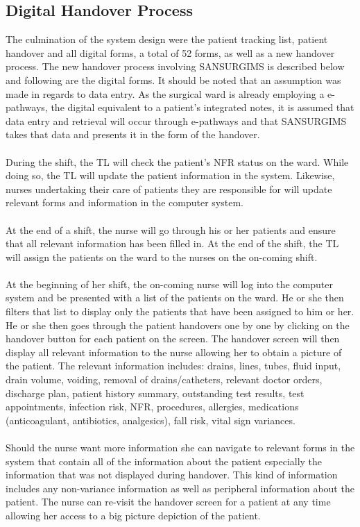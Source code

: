 \subsection{Digital Handover Process}
\label{Digital Handover Process}
The culmination of the system design were the patient tracking list, patient handover and all digital forms, a total of 52 forms, as well as a new handover process. The new handover process involving SANSURGIMS is described below and following are the digital forms. It should be noted that an assumption was made in regards to data entry. As the surgical ward is already employing a e-pathways, the digital equivalent to a patient's integrated notes, it is assumed that data entry and retrieval will occur through e-pathways and that SANSURGIMS takes that data and presents it in the form of the handover.
\\ \\
During the shift, the TL will check the patient's NFR status on the ward. While doing so, the TL will update the patient information in the system. Likewise, nurses undertaking their care of patients they are responsible for will update relevant forms and information in the computer system. 
\\ \\
At the end of a shift, the nurse will go through his or her patients and ensure that all relevant information has been filled in. At the end of the shift, the TL will assign the patients on the ward to the nurses on the on-coming shift.
\\ \\
At the beginning of her shift, the on-coming nurse will log into the computer system and be presented with a list of the patients on the ward. He or she then filters that list to display only the patients that have been assigned to him or her. He or she then goes through the patient handovers one by one by clicking on the handover button for each patient on the screen. The handover screen will then display all relevant information to the nurse allowing her to obtain a picture of the patient. The relevant information includes: drains, lines, tubes, fluid input, drain volume, voiding, removal of drains/catheters, relevant doctor orders, discharge plan, patient history summary, outstanding test results, test appointments, infection risk, NFR, procedures, allergies, medications (anticoagulant, antibiotics, analgesics), fall risk, vital sign variances. 
\\ \\
Should the nurse want more information she can navigate to relevant forms in the system that contain all of the information about the patient especially the information that was not displayed during handover. This kind of information includes any non-variance information as well as peripheral information about the patient. The nurse can re-visit the handover screen for a patient at any time allowing her access to a big picture depiction of the patient.

